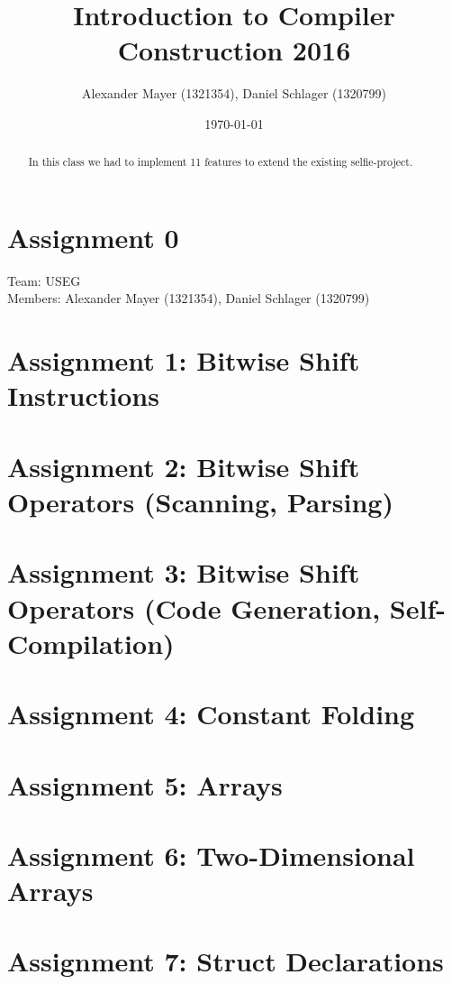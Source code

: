 \documentclass[a4paper,12pt]{article}
\begin{document}
\title{Introduction to Compiler Construction 2016}
\author{Alexander Mayer (1321354), Daniel Schlager (1320799)}
\date{\today}
\maketitle

\begin{abstract}
In this class we had to implement 11 features to extend the existing selfie-project.
\end{abstract}

\section{Assignment 0}
Team: USEG\\
Members: Alexander Mayer (1321354), Daniel Schlager (1320799)

\section{Assignment 1: Bitwise Shift Instructions}

\section{Assignment 2: Bitwise Shift Operators (Scanning, Parsing)}

\section{Assignment 3: Bitwise Shift Operators (Code Generation, Self-Compilation)}

\section{Assignment 4: Constant Folding}

\section{Assignment 5: Arrays}

\section{Assignment 6: Two-Dimensional Arrays}

\section{Assignment 7: Struct Declarations}
\end{document}
